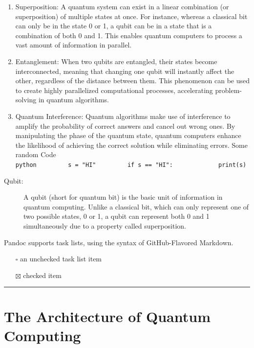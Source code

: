 \documentclass[
  12pt,
  a4paper,
  ]{report}
\providecommand{\tightlist}{%
  \setlength{\itemsep}{0pt}\setlength{\parskip}{0pt}}
\begin{document}
\begin{enumerate}
\def\labelenumi{\arabic{enumi}.}
\item
  Superposition: A quantum system can exist in a linear combination (or
  superposition) of multiple states at once. For instance, whereas a
  classical bit can only be in the state 0 or 1, a qubit can be in a
  state that is a combination of both 0 and 1. This enables quantum
  computers to process a vast amount of information in parallel.
\item
  Entanglement: When two qubits are entangled, their states become
  interconnected, meaning that changing one qubit will instantly affect
  the other, regardless of the distance between them. This phenomenon
  can be used to create highly parallelized computational processes,
  accelerating problem-solving in quantum algorithms.
\item
  Quantum Interference: Quantum algorithms make use of interference to
  amplify the probability of correct answers and cancel out wrong ones.
  By manipulating the phase of the quantum state, quantum computers
  enhance the likelihood of achieving the correct solution while
  eliminating errors. Some random Code
  \texttt{python\ \ \ \ \ \ \ \ \ s\ =\ "HI"\ \ \ \ \ \ \ \ \ if\ s\ ==\ "HI":\ \ \ \ \ \ \ \ \ \ \ \ \ print(s)}
\end{enumerate}

\begin{description}
\item[Qubit:]
A qubit (short for quantum bit) is the basic unit of information in
quantum computing. Unlike a classical bit, which can only represent one
of two possible states, 0 or 1, a qubit can represent both 0 and 1
simultaneously due to a property called superposition.
\end{description}

Pandoc supports task lists, using the syntax of GitHub-Flavored
Markdown.

\begin{itemize}
\tightlist
\item[$\square$]
  an unchecked task list item
\item[$\boxtimes$]
  checked item
\end{itemize}

\begin{center}\rule{0.5\linewidth}{0.5pt}\end{center}

\chapter{The Architecture of Quantum
Computing}\label{the-architecture-of-quantum-computing}
\end{document}
